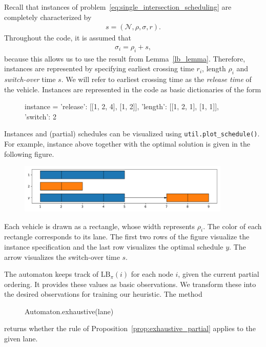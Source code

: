 \documentclass[a4paper]{article}
\theoremstyle{definition}
\theoremstyle{plain}
\begin{document}
Recall that instances of
problem~\eqref{eq:single_intersection_scheduling} are completely characterized
by
\begin{align*}
  s = (\mathcal{N}, \rho, \sigma, r) .
\end{align*}
Throughout the code, it is assumed that
\begin{align*}
  \sigma_{i} = \rho_{i} + s ,
\end{align*}
because this allows us to use the result from Lemma~\ref{lb_lemma}.
Therefore, instances are represented by specifying earliest crossing time
$r_{i}$, length $\rho_{i}$ and \textit{switch-over} time $s$.
We will refer to earliest crossing time as the \textit{release time} of the vehicle.
Instances are represented in the code as basic dictionaries of the form
\begin{figure}[H]
\centering
\begin{cminted}
instance = {
    'release': [[1, 2, 4], [1, 2]],
    'length':  [[1, 2, 1], [1, 1]],
    'switch':  2
}
\end{cminted}
\end{figure}
%
\noindent
Instances and (partial) schedules can be visualized using
\texttt{util.plot\_schedule()}. For example, instance above together with the optimal
solution is given in the following figure.
\begin{figure}[H]
\centering
\includegraphics[width=0.9\textwidth]{figures/example_schedule.pdf}
\end{figure}
\noindent
Each vehicle is drawn as a rectangle, whose width represents $\rho_{i}$. The color
of each rectangle corresponds to its lane. The first two rows of the figure
visualize the instance specification and the last row visualizes the optimal
schedule $y$. The arrow visualizes the switch-over time $s$.

The automaton keeps track of $\text{LB}_{\pi}(i)$ for each node $i$, given the
current partial ordering. It provides these values as basic observations. We
transform these into the desired observations for training our heuristic. The method
\begin{figure}[H]
\centering
\begin{cminted}
  Automaton.exhaustive(lane)
\end{cminted}
\end{figure}
%
\noindent
returns whether the rule of
Proposition~\ref{prop:exhaustive_partial} applies to the given lane.
\end{document}
